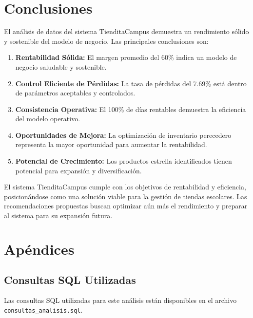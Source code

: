\documentclass[12pt,a4paper]{article}
\begin{document}
\section{Conclusiones}

El análisis de datos del sistema TienditaCampus demuestra un rendimiento sólido y sostenible del modelo de negocio. Las principales conclusiones son:

\begin{enumerate}
    \item \textbf{Rentabilidad Sólida:} El margen promedio del 60\% indica un modelo de negocio saludable y sostenible.
    
    \item \textbf{Control Eficiente de Pérdidas:} La tasa de pérdidas del 7.69\% está dentro de parámetros aceptables y controlados.
    
    \item \textbf{Consistencia Operativa:} El 100\% de días rentables demuestra la eficiencia del modelo operativo.
    
    \item \textbf{Oportunidades de Mejora:} La optimización de inventario perecedero representa la mayor oportunidad para aumentar la rentabilidad.
    
    \item \textbf{Potencial de Crecimiento:} Los productos estrella identificados tienen potencial para expansión y diversificación.
\end{enumerate}

El sistema TienditaCampus cumple con los objetivos de rentabilidad y eficiencia, posicionándose como una solución viable para la gestión de tiendas escolares. Las recomendaciones propuestas buscan optimizar aún más el rendimiento y preparar al sistema para su expansión futura.

\appendix
\section{Apéndices}

\subsection{Consultas SQL Utilizadas}
Las consultas SQL utilizadas para este análisis están disponibles en el archivo \texttt{consultas\_analisis.sql}.
\end{document}
